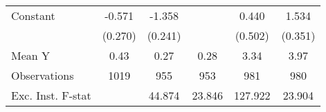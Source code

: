 {\begin{tabular}{l*{5}{c}}
\addlinespace
Constant            &      -0.571\sym{**} &      -1.358\sym{***}&                     &       0.440         &       1.534\sym{***}\\
                    &     (0.270)         &     (0.241)         &                     &     (0.502)         &     (0.351)         \\
\midrule
Mean Y              &        0.43         &        0.27         &        0.28         &        3.34         &        3.97         \\
Observations        &        1019         &         955         &         953         &         981         &         980         \\
Exc. Inst. F-stat   &                     &      44.874         &      23.846         &     127.922         &      23.904         \\
\bottomrule
\end{tabular}
}
